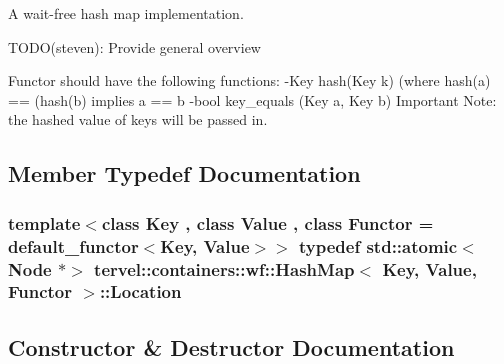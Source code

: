 A wait-\/free hash map implementation. 

T\+O\+D\+O(steven)\+: Provide general overview

Functor should have the following functions\+: -\/\+Key hash(\+Key k) (where hash(a) == (hash(b) implies a == b -\/bool key\+\_\+equals (Key a, Key b) Important Note\+: the hashed value of keys will be passed in. 

\subsection{Member Typedef Documentation}
\hypertarget{classtervel_1_1containers_1_1wf_1_1_hash_map_ab2c04cbf19034689a795208e0108fe8a}{}
\subsubsection[{Location}]{\setlength{\rightskip}{0pt plus 5cm}template$<$class Key , class Value , class Functor  = default\+\_\+functor$<$\+Key, Value$>$$>$ typedef std\+::atomic$<${\bf Node} $\ast$$>$ {\bf tervel\+::containers\+::wf\+::\+Hash\+Map}$<$ Key, {\bf Value}, Functor $>$\+::{\bf Location}\hspace{0.3cm}{\ttfamily [private]}}\label{classtervel_1_1containers_1_1wf_1_1_hash_map_ab2c04cbf19034689a795208e0108fe8a}


\subsection{Constructor \& Destructor Documentation}
\hypertarget{classtervel_1_1containers_1_1wf_1_1_hash_map_ad8c150cd36ed719afb858430337f1c62}{}

